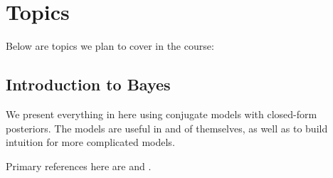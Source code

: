 \documentclass{article} %
\begin{document}
\section{Topics}

Below are topics we plan to cover in the course:

\subsection{Introduction to Bayes}

We present everything in here using conjugate models with closed-form posteriors.  The models are useful in and of themselves,  as well as to build intuition for more complicated models.   

Primary references here are \cite{hoff2009first} and \cite{gelman2013bayesian}.
\end{document}
